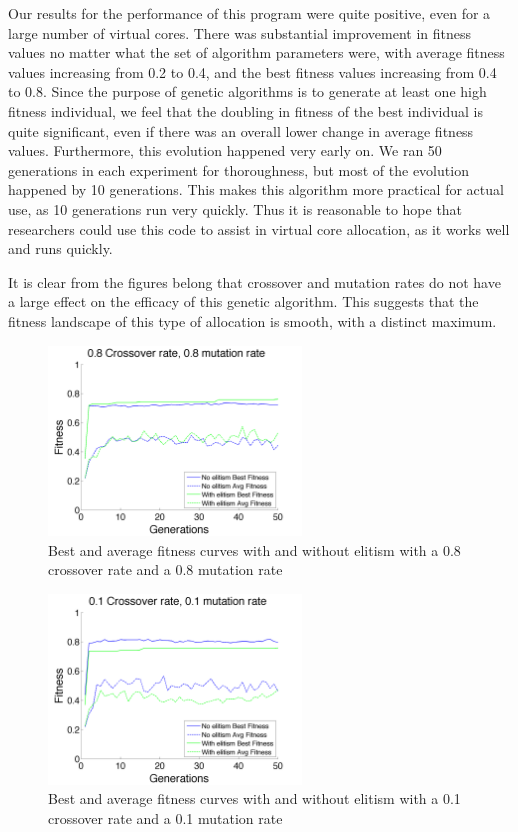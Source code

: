 \documentclass[11pt]{article}
\begin{document}
Our results for the performance of this program were quite positive, even for a large number of virtual cores. There was substantial improvement in fitness values no matter what the set of algorithm parameters were, with average fitness values increasing from 0.2 to 0.4, and the best fitness values increasing from 0.4 to 0.8. Since the purpose of genetic algorithms is to generate at least one high fitness individual, we feel that the doubling in fitness of the best individual is quite significant, even if there was an overall lower change in average fitness values. Furthermore, this evolution happened very early on. We ran 50 generations in each experiment for thoroughness, but most of the evolution happened by 10 generations. This makes this algorithm more practical for actual use, as 10 generations run very quickly. Thus it is reasonable to hope that researchers could use this code to assist in virtual core allocation, as it works well and runs quickly. 

It is clear from the figures belong that crossover and mutation rates do not have a large effect on the efficacy of this genetic algorithm. This suggests that the fitness landscape of this type of allocation is smooth, with a distinct maximum. 

\begin{figure}[H]
 \centering
  \includegraphics[width=0.6\textwidth,height=0.2\textheight]{figures/fitness08mut08cross.png}
  \caption{Best and average fitness curves with and without elitism with a 0.8 crossover rate and a 0.8 mutation rate}
  \label{fig:fig1}  
\end{figure} 

\begin{figure}[H]
 \centering
  \includegraphics[width=0.6\textwidth,height=0.2\textheight]{figures/fitness01mut01cross.png}
  \caption{Best and average fitness curves with and without elitism with a 0.1 crossover rate and a 0.1 mutation rate}
  \label{fig:fig2}  
\end{figure}
\end{document}
